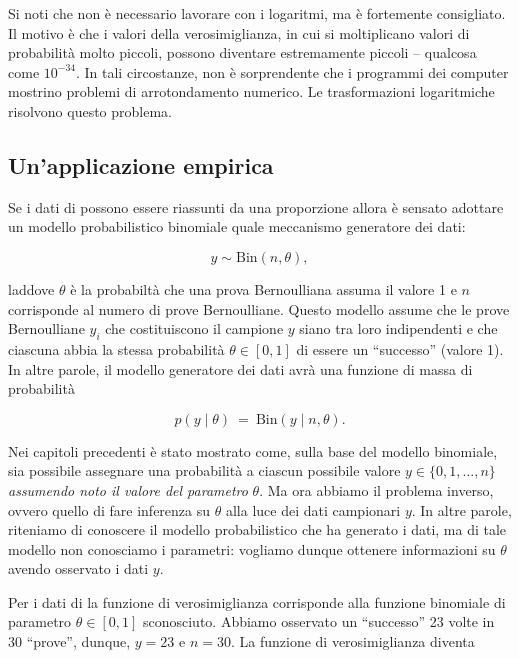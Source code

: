 \documentclass[
  11pt,
]{krantz}
\theoremstyle{definition}
\theoremstyle{definition}
\theoremstyle{definition}
\theoremstyle{definition}
\theoremstyle{remark}
\begin{document}
Si noti che non è necessario lavorare con i logaritmi, ma è fortemente consigliato. Il motivo è che i valori della verosimiglianza, in cui si moltiplicano valori di probabilità molto piccoli, possono diventare estremamente piccoli -- qualcosa come \(10^{-34}\). In tali circostanze, non è sorprendente che i programmi dei computer mostrino problemi di arrotondamento numerico. Le trasformazioni logaritmiche risolvono questo problema.

\hypertarget{unapplicazione-empirica-1}{%
\subsection{Un'applicazione empirica}\label{unapplicazione-empirica-1}}

Se i dati di \citet{zetschefuture2019} possono essere riassunti da una proporzione allora è sensato adottare un modello probabilistico binomiale quale meccanismo generatore dei dati:

\begin{equation}
y  \sim \mbox{Bin}(n, \theta),
\label{eq:binomialmodel}
\end{equation}

laddove \(\theta\) è la probabiltà che una prova Bernoulliana assuma il valore 1 e \(n\) corrisponde al numero di prove Bernoulliane. Questo modello assume che le prove Bernoulliane \(y_i\) che costituiscono il campione \(y\) siano tra loro indipendenti e che ciascuna abbia la stessa probabilità \(\theta \in [0, 1]\) di essere un ``successo'' (valore 1). In altre parole, il modello generatore dei dati avrà una funzione di massa di probabilità

\[
p(y \mid \theta)
\ = \
\mbox{Bin}(y \mid n, \theta).
\]

Nei capitoli precedenti è stato mostrato come, sulla base del modello binomiale, sia possibile assegnare una probabilità a ciascun possibile valore \(y \in \{0, 1, \dots, n\}\) \emph{assumendo noto il valore del parametro} \(\theta\). Ma ora abbiamo il problema inverso, ovvero quello di fare inferenza su \(\theta\) alla luce dei dati campionari \(y\). In altre parole, riteniamo di conoscere il modello probabilistico che ha generato i dati, ma di tale modello non conosciamo i parametri: vogliamo dunque ottenere informazioni su \(\theta\) avendo osservato i dati \(y\).

Per i dati di \citet{zetschefuture2019} la funzione di verosimiglianza corrisponde alla funzione binomiale di parametro \(\theta \in [0, 1]\) sconosciuto. Abbiamo osservato un ``successo'' 23 volte in 30 ``prove'', dunque, \(y = 23\) e \(n = 30\). La funzione di verosimiglianza diventa
\end{document}
